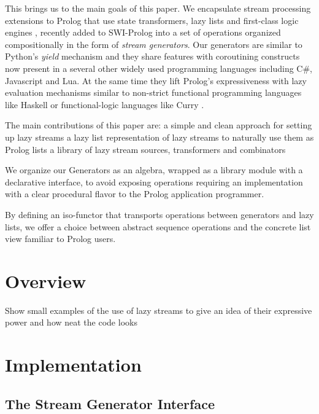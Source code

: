 \documentclass{new_tlp}
\begin{document}
This brings us to the main goals of this paper. 
We encapsulate stream processing extensions to Prolog that use
state transformers, lazy lists and first-class logic engines 
\cite{tarau:cl2000,bp2011}, recently added to SWI-Prolog \cite{swi_engines}
into a set of operations organized compositionally in the form of {\em 
stream generators}.
Our generators are similar to Python's {\em yield} mechanism \cite{beazley09} and 
they share features with coroutining constructs now present in a several other widely used programming languages including C\#, Javascript and Lua. At the same time 
they lift Prolog's expressiveness with lazy evaluation mechanisms similar to non-strict
functional programming languages like Haskell \cite{hudak07} or functional-logic languages like Curry \cite{antoy05}.


The main contributions of this paper are:
\BI
\I a simple and clean approach for setting up lazy streams
\I a lazy list representation of lazy streams to naturally use them as Prolog lists
\I a library of lazy stream sources, transformers and combinators %
\EI

We organize our Generators as an algebra, wrapped as a library module with a declarative interface, to avoid exposing  operations requiring an implementation with a clear procedural flavor to the Prolog application programmer.

By defining an iso-functor that transports operations between
generators and lazy lists, we offer a choice between 
abstract sequence operations and the concrete list view familiar to Prolog users.





\section{Overview}

{\Large
     Show small examples of the use of lazy streams to give an idea of their expressive power and how neat the code looks
 }
     
     
\section{Implementation}
     
\subsection{The Stream Generator Interface}
\end{document}
